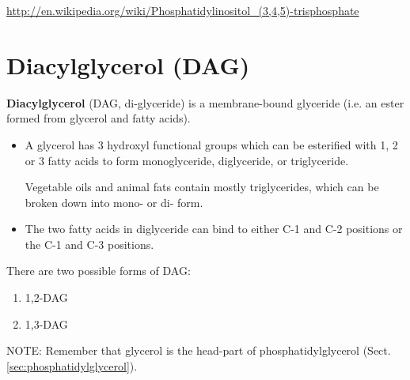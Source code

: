 


\url{http://en.wikipedia.org/wiki/Phosphatidylinositol_(3,4,5)-trisphosphate}

\section{Diacylglycerol (DAG)}
\label{sec:DAG}
\label{sec:DAG_synthesis}

{\bf Diacylglycerol} (DAG, di-glyceride) is a membrane-bound glyceride (i.e. an
ester formed from glycerol and fatty acids). 

\begin{itemize}
  \item A glycerol has 3 hydroxyl functional groups which can be esterified with
  1, 2 or 3 fatty acids to form monoglyceride, diglyceride, or triglyceride.

Vegetable oils and animal fats contain mostly triglycerides, which can be broken
down into mono- or di- form.

  \item The two fatty acids in diglyceride can bind to either C-1 and C-2
  positions or the C-1 and C-3 positions.
  
\end{itemize}

There are two possible forms of DAG:
\begin{enumerate}
  \item 1,2-DAG
  
  \item 1,3-DAG
\end{enumerate}
NOTE: Remember that glycerol is the head-part of phosphatidylglycerol
(Sect.\ref{sec:phosphatidylglycerol}).


